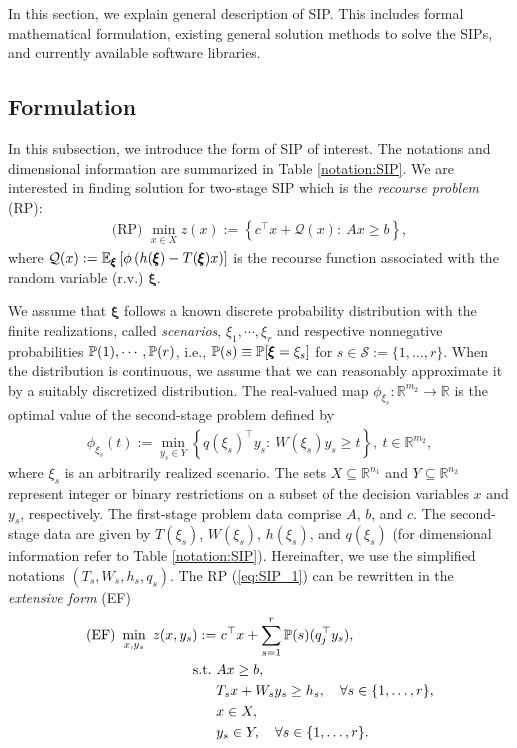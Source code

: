 In this section, we explain general description of SIP. This includes formal mathematical formulation, existing general solution methods to solve the SIPs, and currently available software libraries.
\subsection{Formulation}
In this subsection, we introduce the form of SIP of interest. The notations and dimensional information are summarized in Table \ref{notation:SIP}. We are interested in finding solution for two-stage SIP which is the \textit{recourse problem} (RP): 
\begin{align}
\textrm{(RP) }\min_{x\in X} z(x):={\left\{c^\top x + \mathcal{Q}(x):\ Ax\ge b\right\}}, \label{eq:SIP_1}
\end{align}
where $\mathcal{Q}(x):=\operatorname*{\mathbb{E}}_{\pmb{\xi}}\left[ \phi\left( h(\pmb{\xi})-T(\pmb{\xi})x \right) \right]$ is the recourse function associated with the random variable (r.v.) $\pmb{\xi}$. 

We assume that $\pmb{\xi}$ follows a known discrete probability distribution with the finite realizations, called \textit{scenarios}, $\xi_1,\cdots,\xi_r$ and respective nonnegative probabilities $\operatorname*{\mathbb{P}}(1),\cdots,\operatorname*{\mathbb{P}}(r)$, i.e., $\operatorname*{\mathbb{P}}(s)\equiv\operatorname*{\mathbb{P}}[\pmb{\xi}=\xi_s]$ for $s\in\mathcal{S}:=\{1,\ldots,r\}$. When the distribution is continuous, we assume that we can reasonably approximate it by a suitably discretized distribution. The real-valued map $\phi_{\xi_s}:\mathbb{R}^{m_2}\to\mathbb{R}$ is the optimal value of the second-stage problem defined by
\begin{align}
\phi_{\xi_s}(t):=\min_{y_s\in Y}\left\{ q(\xi_s)^\top y_s:\ W(\xi_s)y_s \ge t \right\},\ t\in\mathbb{R}^{m_2},
\end{align}
where $\xi_s$ is an arbitrarily realized scenario.
The sets $X\subseteq \mathbb{R}^{n_1}$ and $Y\subseteq\mathbb{R}^{n_2}$ represent integer or binary restrictions on a subset of the decision variables $x$ and $y_s$, respectively. 
The first-stage problem data comprise $A$, $b$, and $c$. The second-stage data are given by $T(\xi_s)$, $W(\xi_s)$, $h(\xi_s)$, and $q(\xi_s)$ (for dimensional information refer to Table \ref{notation:SIP}). Hereinafter, we use the simplified notations $(T_s,W_s,h_s,q_s)$.
The RP (\ref{eq:SIP_1}) can be rewritten in the \textit{extensive form} (EF)
\begin{subequations}\label{sip:ef}
\begin{align}
\textrm{(EF) }\min_{x,y_s}\ z(x,y_s):=&\ c^{\top}x + \sum_{s=1}^{r}\operatorname*{\mathbb{P}}(s) (q_j^{\top}y_s), \label{ef:obj}\\ 
\mathrm{s.t.}\ &Ax\ge b,  \label{ef:b}\\
	&T_s x+W_s y_s\ge h_s,\quad\forall s\in\{1,\ldots,r\}, \label{ef:c} \\
	&x\in X, \label{ef:d} \\
	&y_s \in Y,\quad\forall s\in\{1,\ldots,r\}. \label{ef:e}
\end{align}
\end{subequations}

